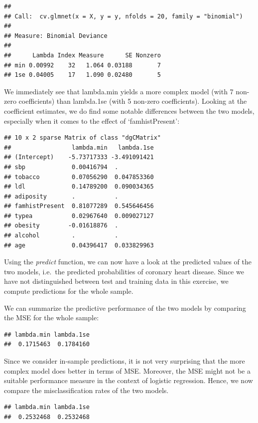 \documentclass[
]{article}
\begin{document}
\begin{verbatim}
## 
## Call:  cv.glmnet(x = X, y = y, nfolds = 20, family = "binomial") 
## 
## Measure: Binomial Deviance 
## 
##      Lambda Index Measure      SE Nonzero
## min 0.00992    32   1.064 0.03188       7
## 1se 0.04005    17   1.090 0.02480       5
\end{verbatim}

We immediately see that lambda.min yields a more complex model (with 7
non-zero coefficients) than lambda.1se (with 5 non-zero coefficients).
Looking at the coefficient estimates, we do find some notable
differences between the two models, especially when it comes to the
effect of `famhistPresent':

\begin{verbatim}
## 10 x 2 sparse Matrix of class "dgCMatrix"
##                 lambda.min   lambda.1se
## (Intercept)    -5.73717333 -3.491091421
## sbp             0.00416794  .          
## tobacco         0.07056290  0.047853360
## ldl             0.14789200  0.090034365
## adiposity       .           .          
## famhistPresent  0.81077289  0.545646456
## typea           0.02967640  0.009027127
## obesity        -0.01618876  .          
## alcohol         .           .          
## age             0.04396417  0.033829963
\end{verbatim}

Using the \textit{predict} function, we can now have a look at the
predicted values of the two models, i.e.~the predicted probabilities of
coronary heart disease. Since we have not distinguished between test and
training data in this exercise, we compute predictions for the whole
sample.

We can summarize the predictive performance of the two models by
comparing the MSE for the whole sample:

\begin{verbatim}
## lambda.min lambda.1se 
##  0.1715463  0.1784160
\end{verbatim}

Since we consider in-sample predictions, it is not very surprising that
the more complex model does better in terms of MSE. Moreover, the MSE
might not be a suitable performance measure in the context of logistic
regression. Hence, we now compare the misclassification rates of the two
models.

\begin{verbatim}
## lambda.min lambda.1se 
##  0.2532468  0.2532468
\end{verbatim}
\end{document}
